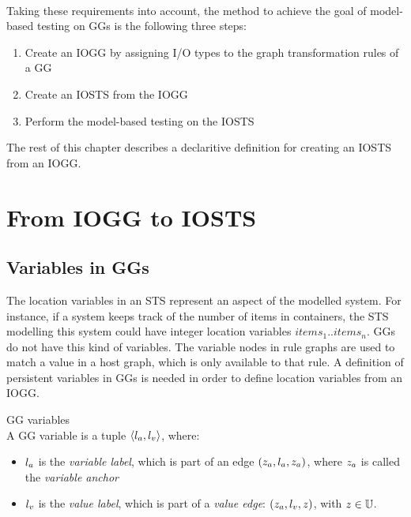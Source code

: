 \paragraph*{} Taking these requirements into account, the method to achieve the goal of model-based testing on GGs is the following three steps:
\begin{enumerate}
\item Create an IOGG by assigning I/O types to the graph transformation rules of a GG
\item Create an IOSTS from the IOGG
\item Perform the model-based testing on the IOSTS
\end{enumerate}
The rest of this chapter describes a declaritive definition for creating an IOSTS from an IOGG.

\section{From IOGG to IOSTS}\label{sec:algorithm}
\subsection{Variables in GGs} 
The location variables in an STS represent an aspect of the modelled system. For instance, if a system keeps track of the number of items in containers, the STS modelling this system could have integer location variables $\mathit{items}_1..\mathit{items}_n$. GGs do not have this kind of variables. The variable nodes in rule graphs are used to match a value in a host graph, which is only available to that rule. A definition of persistent variables in GGs is needed in order to define location variables from an IOGG.

\vspace{10px}
\begin{definition} GG variables \\
A GG variable is a tuple $\langle l_a, l_v\rangle$, where:
\begin{itemize}
\item {}$l_a$ is the \textit{variable label}, which is part of an edge $(z_a, l_a, z_a)$, where $z_a$ is called the \textit{variable anchor}
\item {}$l_v$ is the \textit{value label}, which is part of a \textit{value edge}: $(z_a, l_v, z)$, with $z \in \mathbb{U}$.
\end{itemize}
\end{definition}
\vspace{10px}

